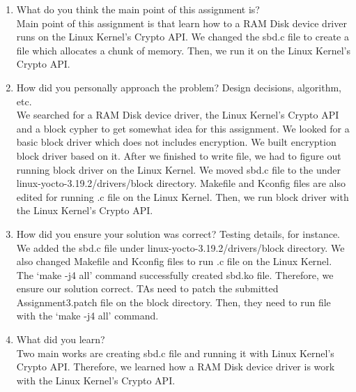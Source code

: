 \documentclass[onecolumn, draftclsnofoot,10pt, compsoc]{IEEEtran}
\begin{document}
    \begin{enumerate}
        \item What do you think the main point of this assignment is? \\
            Main point of this assignment is that learn how to a RAM Disk device driver runs on the Linux Kernel’s Crypto API. We changed the sbd.c file to create a file which allocates a chunk of memory. Then, we run it on the Linux Kernel’s Crypto API. 
            
        \item How did you personally approach the problem? Design decisions, algorithm, etc. \\
            We searched for a RAM Disk device driver, the Linux Kernel’s Crypto API and a block cypher to get somewhat idea for this assignment. We looked for a basic block driver which does not includes encryption. We built encryption block driver based on it. After we finished to write file, we had to figure out running block driver on the Linux Kernel. We moved sbd.c file to the under linux-yocto-3.19.2/drivers/block directory. Makefile and Kconfig files are also edited for running .c file on the Linux Kernel. Then, we run block driver with the Linux Kernel's Crypto API.

        \item How did you ensure your solution was correct? Testing details, for instance. \\
            We added the sbd.c file under linux-yocto-3.19.2/drivers/block directory. We also changed Makefile and Kconfig files to run .c file on the Linux Kernel. The ‘make -j4 all’ command successfully created sbd.ko file. Therefore, we ensure our solution correct. TAs need to patch the submitted Assignment3.patch file on the block directory. Then, they need to run file with the ‘make -j4 all’ command.

        \item What did you learn? \\
            Two main works are creating sbd.c file and running it with Linux Kernel’s Crypto API. Therefore, we learned how a RAM Disk device driver is work with the Linux Kernel’s Crypto API.
            
     \end{enumerate} 
\end{document}
